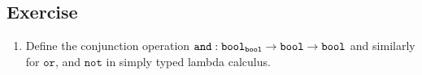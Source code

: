 \subsection*{Exercise}
\begin{enumerate}
  \item Define the conjunction operation $\mathtt{and} : \mathtt{bool}_{\mathtt{bool}} \to \mathtt{bool}
    \to \mathtt{bool}$ and similarly for $\mathtt{or}$, and $\mathtt{not}$
    in simply typed lambda calculus.
\end{enumerate}


 


